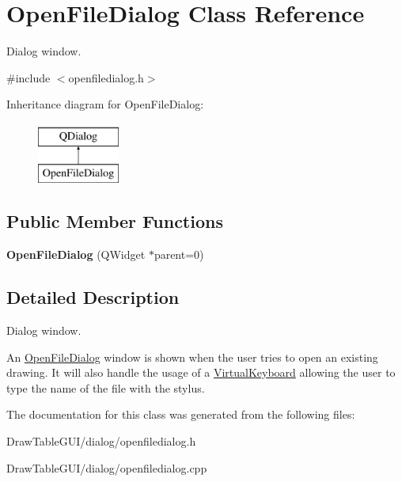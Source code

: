 \hypertarget{classOpenFileDialog}{}\section{Open\+File\+Dialog Class Reference}
\label{classOpenFileDialog}


Dialog window.  




{\ttfamily \#include $<$openfiledialog.\+h$>$}

Inheritance diagram for Open\+File\+Dialog\+:\begin{figure}[H]
\begin{center}
\leavevmode
\includegraphics[height=2.000000cm]{classOpenFileDialog}
\end{center}
\end{figure}
\subsection*{Public Member Functions}
\begin{DoxyCompactItemize}
\item 
\hypertarget{classOpenFileDialog_afbd824a608519ed9c91de8a1b67fcbf6}{}{\bfseries Open\+File\+Dialog} (Q\+Widget $\ast$parent=0)\label{classOpenFileDialog_afbd824a608519ed9c91de8a1b67fcbf6}

\end{DoxyCompactItemize}


\subsection{Detailed Description}
Dialog window. 

An \hyperlink{classOpenFileDialog}{Open\+File\+Dialog} window is shown when the user tries to open an existing drawing. It will also handle the usage of a \hyperlink{classVirtualKeyboard}{Virtual\+Keyboard} allowing the user to type the name of the file with the stylus. 

The documentation for this class was generated from the following files\+:\begin{DoxyCompactItemize}
\item 
Draw\+Table\+G\+U\+I/dialog/openfiledialog.\+h\item 
Draw\+Table\+G\+U\+I/dialog/openfiledialog.\+cpp\end{DoxyCompactItemize}

